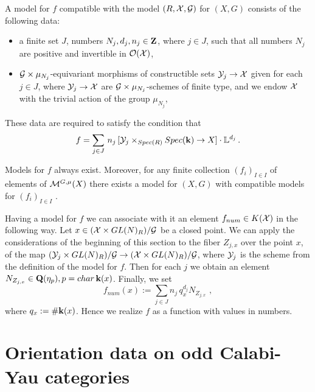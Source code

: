 \documentclass[12pt]{article}
\begin{document}
\begin{defn}

A model for $f$ compatible with the model $(R,{\cal X},{\cal G}) $ for $(X,G)$ consists of the following data:
\begin{itemize}
\item a finite set $J$, numbers $N_j,d_j, n_j\in {\bf Z}$, where $j\in J$, such that all numbers $N_j$ are positive and invertible in
 ${\cal O}({\cal X})$,
\item ${\cal G} \times \mu_{N_j}$-equivariant morphisms of constructible sets
${\cal Y}_j\to {\cal X}$ given for each $j\in J$, where ${\cal Y}_j\to {\cal X}$ are ${\cal G}\times \mu_{N_j}$-schemes of finite type, and we endow ${\cal X}$ with the trivial action of the group $\mu_{N_j}$,
\end{itemize}
These data are required to satisfy the condition that 
$$f=\sum_{j\in J}\,n_j\,[{\cal Y}_j\times_{Spec(R)}Spec({\bf k})\to X]\cdot{\mathbb L}^{d_j}\,.$$
\end{defn}
Models for $f$ always exist. Moreover, for any finite collection $(f_i)_{I\in I}$ of
elements of ${\cal M}^{G,\mu}(X)$ there exists a  model for $(X,G)$ with compatible models for $(f_i)_{I\in I}$ .


Having a model for $f$ we can associate with it an element $f_{num}\in K({\cal X})$ in the following way.
Let $x\in ({\cal X}\times GL(N)_R)/{\cal G}$ be a closed point. We can apply the considerations of the beginning of this section to the fiber $Z_{j,x}$ over the point $x$, of the map $({\cal Y}_j\times GL(N)_R)/{\cal G}\to ({\cal X}\times GL(N)_R)/{\cal G}$, where ${\cal Y}_j$ is the scheme from the definition of the model for $f$. Then for each $j$ we obtain an 
element $N_{Z_{j,x}}\in {\bf Q}(\eta_p), p=char\,{\bf k}(x)$. Finally, we set
$$f_{num}(x):=\sum_{j\in J}n_j\,q_x^{d_j}N_{Z_{j,x}}\,\,,$$
where $q_x:=\#{\bf k}(x)$. Hence we realize $f$ as a function with values in numbers.

























\section{Orientation data on odd Calabi-Yau categories}
\end{document}
